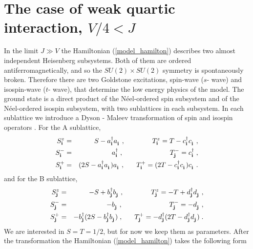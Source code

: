 \section{The case of weak quartic interaction, $V/4 < J$}

In the limit $J\gg V$ the Hamiltonian (\ref{model_hamilton})
describes two almost independent Heisenberg subsystems.
Both of them are ordered antiferromagnetically, and so the
$SU(2)\times SU(2)$ symmetry is spontaneously broken.
Therefore there are two Goldstone excitations, 
spin-wave ($s$- wave) and isospin-wave ($t$- wave), that determine the
low energy physics of the model. 
The ground state 
is a direct product of the N\'eel-ordered 
spin subsystem and of the N\'eel-ordered 
isospin subsystem, with two sublattices in each subsystem.
In each sublattice we introduce a Dyson - Maleev transformation of spin 
and isospin operators \cite{DM}. For the A sublattice,
\begin{eqnarray}  
\label{eq_dm_UP}
S_{\bf i}^z & = & S- a^{\dagger}_{\bf i} a^{\phantom{\dagger}}_{\bf i}\; , 
\hskip 14 mm 
T_{\bf i}^z  =  T - c^{\dagger}_{\bf i} c^{\phantom{\dagger}}_{\bf i} \; , 
\nonumber \\
S_{\bf i}^- & = & a^{\dagger}_{\bf i} \; , 
\hskip 24 mm 
T_{\bf j}^-  =  c^{\dagger}_{\bf i} \; , 
\\
S_{\bf i}^+ & = & (2S- a^{\dagger}_{\bf i} a^{\phantom{\dagger}}_{\bf i} )
a^{\phantom{\dagger}}_{\bf i} \; , 
\hskip 6 mm 
T_{\bf i}^+  =  (2T- c^{\dagger}_{\bf i} c^{\phantom{\dagger}}_{\bf i} )
c^{\phantom{\dagger}}_{\bf i} \; .
\nonumber
\end{eqnarray}
and for the B sublattice,
\begin{eqnarray}  \label{eq_dm_DOWN}
S_{\bf j}^z & = & -S + b^{\dagger}_{\bf j} b^{\phantom{\dagger}}_{\bf j} \; , 
\hskip 14 mm 
T_{\bf j}^z  =  -T + d^{\dagger}_{\bf j} d^{\phantom{\dagger}}_{\bf j} \; , 
\nonumber \\
S_{\bf j}^- & = & - b^{\phantom{\dagger}}_{\bf j} \; , 
\hskip 24 mm 
T_{\bf j}^-  =  - d^{\phantom{\dagger}}_{\bf j} \; , 
\\
S_{\bf j}^+ & = & -b^{\dagger}_{\bf j} 
( 2S - b^{\dagger}_{\bf j} b^{\phantom{\dagger}}_{\bf j} )\; ,
\hskip 6 mm 
T_{\bf j}^+  =  -d^{\dagger}_{\bf j} 
( 2T - d^{\dagger}_{\bf j} d^{\phantom{\dagger}}_{\bf j} )\; .
\nonumber
\end{eqnarray}
We are interested in $S=T=1/2$, but for now we keep them as
parameters.
After the transformation the Hamiltonian (\ref{model_hamilton})
takes the following form 


